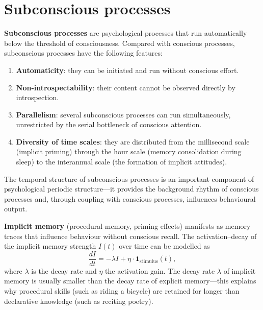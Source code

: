 \section{Subconscious processes}

\begin{definition}\label{def:subconscious_process}
\textbf{Subconscious processes} are psychological processes that run automatically below the threshold of consciousness. Compared with conscious processes, subconscious processes have the following features:
\begin{enumerate}[label=(\roman*)]
    \item \textbf{Automaticity}: they can be initiated and run without conscious effort.
    \item \textbf{Non-introspectability}: their content cannot be observed directly by introspection.
    \item \textbf{Parallelism}: several subconscious processes can run simultaneously, unrestricted by the serial bottleneck of conscious attention.
    \item \textbf{Diversity of time scales}: they are distributed from the millisecond scale (implicit priming) through the hour scale (memory consolidation during sleep) to the interannual scale (the formation of implicit attitudes).
\end{enumerate}
The temporal structure of subconscious processes is an important component of psychological periodic structure---it provides the background rhythm of conscious processes and, through coupling with conscious processes, influences behavioural output.
\end{definition}

\begin{definition}\label{def:implicit_memory}
\textbf{Implicit memory} (procedural memory, priming effects) manifests as memory traces that influence behaviour without conscious recall. The activation--decay of the implicit memory strength $I(t)$ over time can be modelled as
\[
\frac{dI}{dt} = -\lambda I + \eta \cdot \mathbf{1}_{\text{stimulus}}(t),
\]
where $\lambda$ is the decay rate and $\eta$ the activation gain. The decay rate $\lambda$ of implicit memory is usually smaller than the decay rate of explicit memory---this explains why procedural skills (such as riding a bicycle) are retained for longer than declarative knowledge (such as reciting poetry).
\end{definition}

